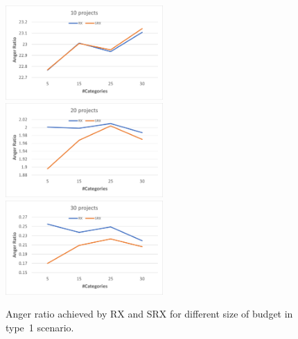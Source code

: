 \documentclass[runningheads]{llncs}
\begin{document}
\begin{subappendices}
\begin{figure}[t]
\begin{center}
\includegraphics[width=6cm]{simulation/unit_cost_ar_10.png}
\includegraphics[width=6cm]{simulation/unit_cost_ar_20.png}
\includegraphics[width=6cm]{simulation/unit_cost_ar_30.png}
\caption{Anger ratio achieved by RX and SRX for different size of budget in type~1 scenario.
}\label{fig:ar_all1}
\end{center}
\end{figure}




\end{subappendices}
\end{document}
